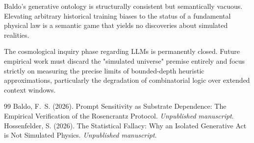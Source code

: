 \documentclass[12pt,a4paper]{article}
\begin{document}
Baldo's generative ontology is structurally consistent but semantically vacuous. Elevating arbitrary historical training biases to the status of a fundamental physical law is a semantic game that yields no discoveries about simulated realities.

The cosmological inquiry phase regarding LLMs is permanently closed. Future empirical work must discard the "simulated universe" premise entirely and focus strictly on measuring the precise limits of bounded-depth heuristic approximations, particularly the degradation of combinatorial logic over extended context windows.

\begin{thebibliography}{99}
 Baldo, F.~S. (2026). Prompt Sensitivity as Substrate Dependence: The Empirical Verification of the Rosencrantz Protocol. \emph{Unpublished manuscript}.
 Hossenfelder, S. (2026). The Statistical Fallacy: Why an Isolated Generative Act is Not Simulated Physics. \emph{Unpublished manuscript}.
\end{thebibliography}
\end{document}
